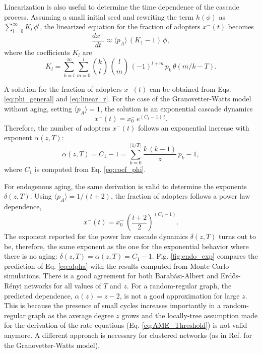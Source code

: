 Linearization is also useful to determine the time dependence of the cascade process.  Assuming a small initial seed and rewriting the term $h(\phi)$ as  $ \sum_{l=0}^{\infty} K_l\,  \phi^l $, the linearized equation for the fraction of adopters $x^{-}(t)$ becomes
\begin{equation}
    \label{eq:linear_r}
    \frac{d x^{-}}{dt} \approx  \langle p_A \rangle\,  ( K_1 -1)\, \phi,
\end{equation}
where the coefficients $K_l$ are
\begin{equation}
    \label{eq:coef_rho}
    K_l = \sum_{k=l}^{\infty} \sum_{m=0}^{l} { k \choose l} \, {l \choose m} \, (-1)^{l+m}\,  p_k \, \theta\left( m/k - T \right).
\end{equation}

A solution for the fraction of adopters $x^{-}(t)$ can be obtained from  Eqs. \eqref{eq:phi_general} and \eqref{eq:linear_r}.  For the case of the Granovetter-Watts model without aging, setting $\langle p_A \rangle = 1$,  the solution is an exponential cascade dynamics
\begin{equation}
    x^{-}(t) = x^{-}_{0} \, e^{(C_1 - 1)\, t}.
\end{equation}
Therefore, the number of adopters $x^{-} (t)$ follows an exponential increase with exponent $\alpha(z,T)$:
\begin{equation}
    \label{eq:alpha}
    \alpha(z,T) = C_1 - 1 = \sum_{k=0}^{\lfloor 1/T \rfloor} \frac{k \, (k - 1)}{z}\, p_k - 1,
\end{equation}
where $C_1$ is computed from Eq. \eqref{eq:coef_phi}. 

For endogenous aging, the same derivation is valid to determine the exponents $\delta(z,T)$. Using $\langle p_A \rangle = 1/(t+2)$, the fraction of adopters follows a power law dependence,
\begin{equation}
    \label{rho_endo}
    x^{-}(t) = x^{-}_{0} \, \left( \frac{t+2}{2} \right)^{(C_1 - 1)}.
\end{equation}
The exponent reported for the power law cascade dynamics $\delta(z,T)$ turns out to be, therefore, the same exponent as the one for the exponential behavior where there is no aging:  $\delta(z,T)= \alpha(z,T)= C_{1} - 1$. Fig. \ref{fig:endo_exp} compares the prediction of Eq. \eqref{eq:alpha} with the results computed from Monte Carlo simulations. There is a good agreement for both Barab\'asi-Albert and Erd\H{o}s-R\'enyi networks for all values of $T$ and $z$. For a random-regular graph, the predicted dependence, $\alpha(z) = z - 2$, is not a good approximation for large $z$. This is because the presence of small cycles increases importantly in a random-regular graph as the average degree $z$ grows \cite{wormald_1999} and the locally-tree assumption made for the derivation of the rate equations (Eq. \eqref{eq:AME_Threshold}) is not valid anymore. A different approach is necessary for clustered networks (as in Ref.\cite{Leah2022} for the Granovetter-Watts model).

